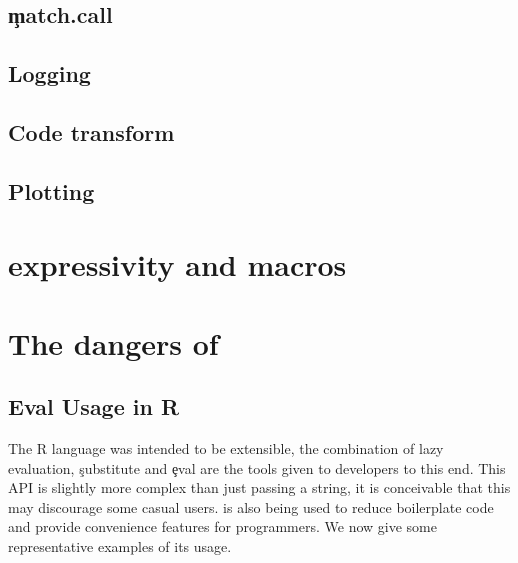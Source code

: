 \documentclass[screen,acmsmall]{acmart}
\begin{document}
\subsection{\c{match.call}}




\subsection{Logging}

\subsection{Code transform}


\subsection{Plotting}

\section{\eval expressivity and macros}


\section{The dangers of \eval} \label{sec:dangerseval}


\subsection{Eval Usage in R}

The R language was intended to be extensible, the combination of lazy
evaluation, \c{substitute} and \c{eval} are the tools given to
developers to this end. This API is slightly more complex than just
passing a string, it is conceivable that this may discourage some
casual users. \Eval is also being used to reduce boilerplate code and
provide convenience features for programmers. We now give some
representative examples of its usage.
\end{document}
